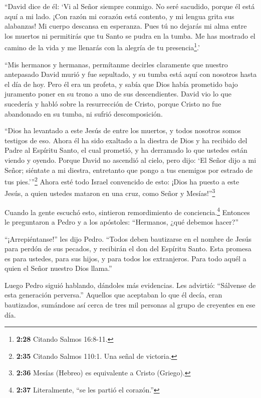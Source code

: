  ``David dice de él: `Vi al Señor siempre conmigo. No seré
sacudido, porque él está aquí a mi lado.  ¡Con razón mi
corazón está contento, y mi lengua grita sus alabanzas! Mi cuerpo
descansa en esperanza.  Pues tú no dejarás mi alma entre
los muertos ni permitirás que tu Santo se pudra en la tumba.
 Me has mostrado el camino de la vida y me llenarás con la
alegría de tu presencia\footnote{\textbf{2:28} Citando Salmos 16:8-11.}.'

 ``Mis hermanos y hermanas, permítanme decirles claramente
que nuestro antepasado David murió y fue sepultado, y su tumba está aquí
con nosotros hasta el día de hoy.  Pero él era un profeta,
y sabía que Dios había prometido bajo juramento poner en su trono a uno
de sus descendientes.  David vio lo que sucedería y habló
sobre la resurrección de Cristo, porque Cristo no fue abandonado en su
tumba, ni sufrió descomposición.

 ``Dios ha levantado a este Jesús de entre los muertos, y
todos nosotros somos testigos de eso.  Ahora él ha sido
exaltado a la diestra de Dios y ha recibido del Padre al Espíritu Santo,
el cual prometió, y ha derramado lo que ustedes están viendo y oyendo.
 Porque David no ascendió al cielo, pero dijo: `El Señor
dijo a mi Señor; siéntate a mi diestra,  entretanto que
pongo a tus enemigos por estrado de tus pies.'''\footnote{\textbf{2:35}
  Citando Salmos 110:1. Una señal de victoria.}  Ahora esté
todo Israel convencido de esto: ¡Dios ha puesto a este Jesús, a quien
ustedes mataron en una cruz, como Señor y Mesías!''\footnote{\textbf{2:36}
  Mesías (Hebreo) es equivalente a Cristo (Griego).}

 Cuando la gente escuchó esto, sintieron remordimiento de
conciencia.\footnote{\textbf{2:37} Literalmente, ``se les partió el
  corazón.''} Entonces le preguntaron a Pedro y a los apóstoles:
``Hermanos, ¿qué debemos hacer?''

 ``¡Arrepiéntanse!'' les dijo Pedro. ``Todos deben
bautizarse en el nombre de Jesús para perdón de sus pecados, y recibirán
el don del Espíritu Santo.  Esta promesa es para ustedes,
para sus hijos, y para todos los extranjeros. Para todo aquél a quien el
Señor nuestro Dios llama.''

 Luego Pedro siguió hablando, dándoles más evidencias. Les
advirtió: ``Sálvense de esta generación perversa.'' 
Aquellos que aceptaban lo que él decía, eran bautizados, sumándose así
cerca de tres mil personas al grupo de creyentes en ese día.

